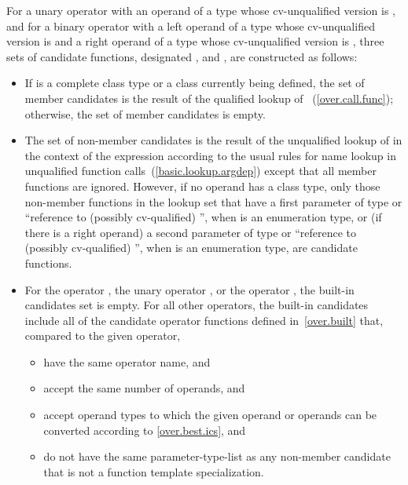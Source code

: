 \pnum
For a unary operator
with an operand of a type whose cv-unqualified version is
,
and for a binary operator
with a left operand of a type whose cv-unqualified version is
and a right operand of a type whose cv-unqualified version is
,
three sets of candidate functions, designated
,
and
,
are constructed as follows:
\begin{itemize}
\item
If
is a complete class type or a class currently being defined, the set of member candidates is the
result of the qualified lookup of
~(\ref{over.call.func}); otherwise, the set of member
candidates is empty.
\item
The set of non-member candidates is the result of the unqualified lookup of
in the context of
the expression according to the usual rules for name
lookup in unqualified function calls~(\ref{basic.lookup.argdep}) except
that all member functions are ignored.
However, if no operand has a class type, only those non-member
functions in the lookup set that have a first parameter of type
or ``reference to (possibly cv-qualified)
'',
when
is an enumeration type,
or (if there is a right operand) a second parameter of type
or ``reference to (possibly cv-qualified)
'',
when
is an enumeration type,
are candidate functions.
\item
For the operator
\tcode{,},
the unary operator
\tcode{\&},
or the operator
\tcode{->},
the built-in candidates set is empty.
For all other operators, the built-in candidates include all
of the candidate operator functions defined in~\ref{over.built} that,
compared to the given operator,

\begin{itemize}
\item
have the same operator name, and
\item
accept the same number of operands, and
\item
accept operand types to which the given operand or
operands can be converted according to \ref{over.best.ics}, and
\item
do not have the same parameter-type-list as any non-member candidate
that is not a function template specialization.
\end{itemize}
\end{itemize}


